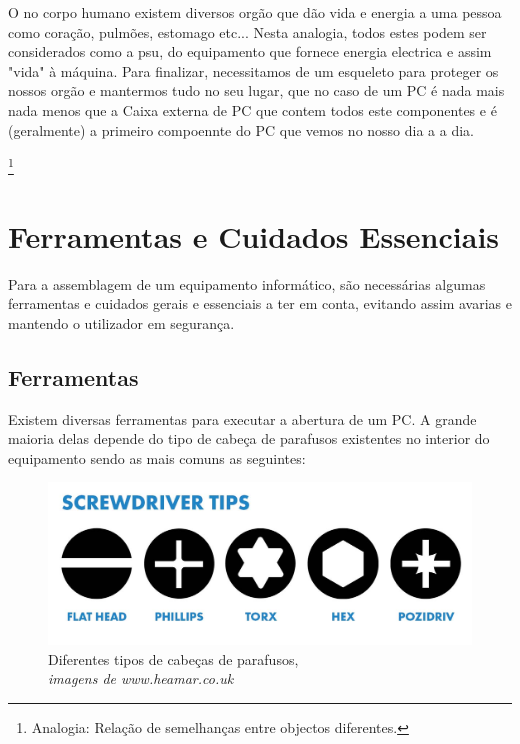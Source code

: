 O no corpo humano existem diversos orgão que dão vida e energia a uma pessoa como coração, pulmões, estomago etc... Nesta analogia, todos estes podem ser considerados como a \ac{psu}, do equipamento que fornece energia electrica e assim "vida" à máquina.
Para finalizar, necessitamos de um esqueleto para proteger os nossos orgão e mantermos tudo no seu lugar, que no caso de um PC é nada mais nada menos que a Caixa externa de PC que contem todos este componentes e é (geralmente) a primeiro compoennte do PC que vemos no nosso dia a a dia.

\footnote{Analogia: Relação de semelhanças entre objectos diferentes.}


\chapter{Ferramentas e Cuidados Essenciais}	
\label{chap.cuidados}
Para a assemblagem de um equipamento informático, são necessárias algumas ferramentas e cuidados gerais e essenciais a ter em conta, evitando assim avarias e mantendo o utilizador em segurança.
\section{Ferramentas}
\label{sec.ferramentas}
Existem diversas ferramentas para executar a abertura de um PC. A grande maioria delas depende do tipo de cabeça de parafusos existentes no interior do equipamento sendo as mais comuns as seguintes:

	\begin{figure}[h!]
		\centering
		\includegraphics[width=15cm]{./chaves.jpeg}
		\caption{Diferentes tipos de cabeças de parafusos, \\ \textsl{imagens de www.heamar.co.uk}}
		\label{fig.cabeçasparafusos}
	\end{figure} 


